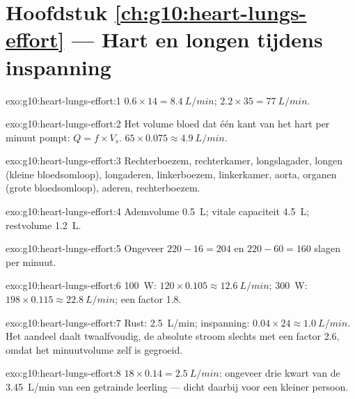 \section*{Hoofdstuk \ref{ch:g10:heart-lungs-effort} --- Hart en longen tijdens inspanning}

\begin{solution}{exo:g10:heart-lungs-effort:1}
$0.6 \times 14 = \qty{8.4}{L/min}$; $2.2 \times 35 = \qty{77}{L/min}$.
\end{solution}

\begin{solution}{exo:g10:heart-lungs-effort:2}
Het volume bloed dat één kant van het hart per minuut pompt:
$Q = f \times V_s$. $65 \times 0.075 \approx \qty{4.9}{L/min}$.
\end{solution}

\begin{solution}{exo:g10:heart-lungs-effort:3}
Rechterboezem, rechterkamer, longslagader, longen (kleine bloedsomloop),
longaderen, linkerboezem, linkerkamer, aorta, organen (grote
bloedsomloop), aderen, rechterboezem.
\end{solution}

\begin{solution}{exo:g10:heart-lungs-effort:4}
Ademvolume \qty{0.5}{L}; vitale capaciteit \qty{4.5}{L}; restvolume
\qty{1.2}{L}.
\end{solution}

\begin{solution}{exo:g10:heart-lungs-effort:5}
Ongeveer $220 - 16 = 204$ en $220 - 60 = 160$ slagen per minuut.
\end{solution}

\begin{solution}{exo:g10:heart-lungs-effort:6}
\qty{100}{W}: $120 \times 0.105 \approx \qty{12.6}{L/min}$;
\qty{300}{W}: $198 \times 0.115 \approx \qty{22.8}{L/min}$; een factor
1.8.
\end{solution}

\begin{solution}{exo:g10:heart-lungs-effort:7}
Rust: \qty{2.5}{L/min}; inspanning: $0.04 \times 24 \approx
\qty{1.0}{L/min}$. Het aandeel daalt twaalfvoudig, de absolute stroom
slechts met een factor 2.6, omdat het minuutvolume zelf is gegroeid.
\end{solution}

\begin{solution}{exo:g10:heart-lungs-effort:8}
$18 \times 0.14 = \qty{2.5}{L/min}$: ongeveer drie kwart van de
\qty{3.45}{L/min} van een getrainde leerling --- dicht daarbij voor een
kleiner persoon.
\end{solution}

